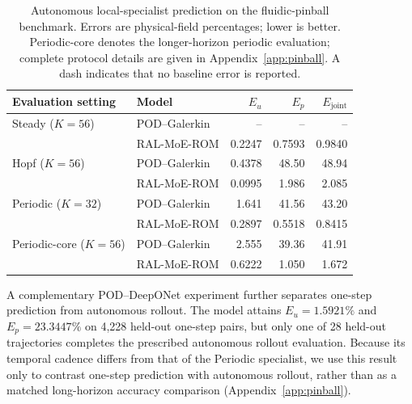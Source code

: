 \documentclass{article}
\begin{document}
\par
\begin{table}[H]
\centering
\caption{
Autonomous local-specialist prediction on the fluidic-pinball benchmark. Errors are physical-field percentages; lower is better. Periodic-core denotes the longer-horizon periodic evaluation; complete protocol details are given in Appendix~\ref{app:pinball}. A dash indicates that no baseline error is reported.
}
\label{tab:pinball_autonomous}
\small
\setlength{\tabcolsep}{5pt}
\begin{tabular}{@{}llrrr@{}}
\toprule
Evaluation setting & Model & $E_u$ & $E_p$ & $E_{\mathrm{joint}}$ \\
\midrule
Steady ($K=56$)
& POD--Galerkin
& -- & -- & -- \\
& RAL-MoE-ROM
& 0.2247 & 0.7593 & 0.9840 \\
\addlinespace

Hopf ($K=56$)
& POD--Galerkin
& 0.4378 & 48.50 & 48.94 \\
& RAL-MoE-ROM
& 0.0995 & 1.986 & 2.085 \\
\addlinespace

Periodic ($K=32$)
& POD--Galerkin
& 1.641 & 41.56 & 43.20 \\
& RAL-MoE-ROM
& 0.2897 & 0.5518 & 0.8415 \\
\addlinespace

Periodic-core ($K=56$)
& POD--Galerkin
& 2.555 & 39.36 & 41.91 \\
& RAL-MoE-ROM
& 0.6222 & 1.050 & 1.672 \\
\bottomrule
\end{tabular}
\end{table}
\par

A complementary POD--DeepONet experiment further separates one-step prediction from autonomous rollout.
The model attains $E_u=1.5921\%$ and $E_p=23.3447\%$ on 4,228 held-out one-step pairs, but only one of 28 held-out trajectories completes the prescribed autonomous rollout evaluation. Because its temporal cadence differs from that of the Periodic specialist, we use this result only to contrast one-step prediction with autonomous rollout, rather than as a matched long-horizon accuracy comparison (Appendix~\ref{app:pinball}).
\end{document}
